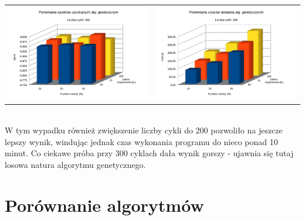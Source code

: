 \documentclass[pdflatex,11pt]{../aghdoc_version2}
\begin{document}
\begin{tabular}{cc}
\includegraphics[width=0.4\paperwidth]{pics/porownanie2/wynik100.png} & 
\includegraphics[width=0.4\paperwidth]{pics/porownanie2/czas100.png} \\
		
\end{tabular}

~ \\
W tym wypadku również zwiększenie liczby cykli do 200 pozwoliło na jeszcze lepszy wynik, windując jednak czas wykonania programu do nieco ponad 10 minut. Co ciekawe próba przy 300 cyklach dała wynik gorszy - ujawnia się tutaj losowa natura algorytmu genetycznego.


\chapter{Porównanie algorytmów}
\end{document}

